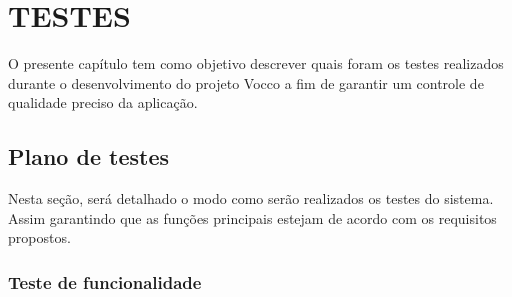 \label{testes}
\chapter{TESTES}

O presente capítulo tem como objetivo descrever quais foram os testes realizados durante o desenvolvimento do projeto Vocco a fim de garantir um controle de qualidade preciso da aplicação.

\section{Plano de testes}
 Nesta seção, será detalhado o modo como serão realizados os testes do sistema. Assim garantindo que as funções principais estejam de acordo com os requisitos propostos.

 \subsection{Teste de funcionalidade}
 
